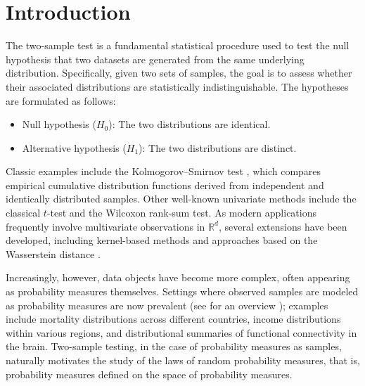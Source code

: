 \section{Introduction}\label{section:two_sample_introduction}

The two-sample test is a fundamental statistical procedure used to test the null hypothesis that two datasets are generated from the same underlying distribution. Specifically, given two sets of samples, the goal is to assess whether their associated distributions are statistically indistinguishable. The hypotheses are formulated as follows:
\begin{itemize}
    \item Null hypothesis ($H_0$): The two distributions are identical.
    \item Alternative hypothesis ($H_1$): The two distributions are distinct.
\end{itemize}
Classic examples include the Kolmogorov–Smirnov test \cite{kolmogorov1933,smirnov1939}, which compares empirical cumulative distribution functions derived from independent and identically distributed samples. Other well-known univariate methods include the classical $t$-test and the Wilcoxon rank-sum test. As modern applications frequently involve multivariate observations in $\mathbb{R}^d$, several extensions have been developed, including kernel-based methods \cite{gretton2012kernel} and approaches based on the Wasserstein distance \cite{ramdas2017wasserstein, wang2021two,wang2021projected, hu2025two}.

Increasingly, however, data objects have become more complex, often appearing as probability measures themselves. Settings where observed samples are modeled as probability measures are now prevalent (see for an overview \cite{petersen2022modeling}); examples include mortality distributions across different countries, income distributions within various regions, and distributional summaries of functional connectivity in the brain. Two-sample testing, in the case of probability measures as samples, naturally motivates the study of the laws of random probability measures, that is, probability measures defined on the space of probability measures.

